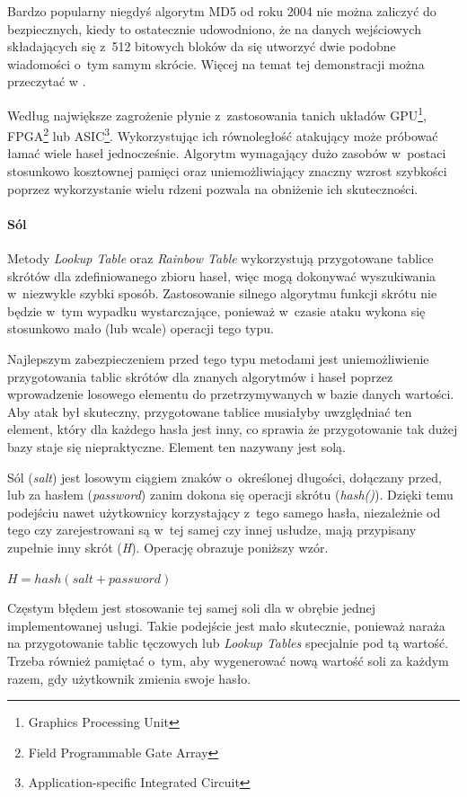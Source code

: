 \documentclass[11pt]{aghdpl}
\begin{document}
Bardzo popularny niegdyś algorytm MD5 od roku 2004 nie można zaliczyć do bezpiecznych, kiedy to ostatecznie udowodniono, że na danych wejściowych składających się z~512 bitowych bloków da się utworzyć dwie podobne wiadomości o~tym samym skrócie. Więcej na temat tej demonstracji można przeczytać w \cite{Md5C06}.

Według \cite{RIG} największe zagrożenie płynie z~zastosowania tanich układów GPU\footnote{Graphics Processing Unit}, FPGA\footnote{Field Programmable Gate Array} lub ASIC\footnote{Application-specific Integrated Circuit}. Wykorzystując ich równoległość atakujący może próbować łamać wiele haseł jednocześnie. Algorytm wymagający dużo zasobów w~postaci stosunkowo kosztownej pamięci oraz uniemożliwiający znaczny wzrost szybkości poprzez wykorzystanie wielu rdzeni pozwala na obniżenie ich skuteczności. 

\paragraph{Sól}
\label{sec:sol}

Metody \emph{Lookup Table} oraz \emph{Rainbow Table} wykorzystują przygotowane tablice skrótów dla zdefiniowanego zbioru haseł, więc mogą dokonywać wyszukiwania w~niezwykle szybki sposób. Zastosowanie silnego algorytmu funkcji skrótu nie będzie w~tym wypadku wystarczające, ponieważ w~czasie ataku wykona się stosunkowo mało (lub wcale) operacji tego typu.

Najlepszym zabezpieczeniem przed tego typu metodami jest uniemożliwienie przygotowania tablic skrótów dla znanych algorytmów i haseł poprzez wprowadzenie losowego elementu do przetrzymywanych w bazie danych wartości. Aby atak był skuteczny, przygotowane tablice musiałyby uwzględniać ten element, który dla każdego hasła jest inny, co sprawia że przygotowanie tak dużej bazy staje się niepraktyczne. Element ten nazywany jest solą.

Sól (\emph{salt}) jest losowym ciągiem znaków o~określonej długości, dołączany przed, lub za hasłem (\emph{password}) zanim dokona się operacji skrótu (\emph{hash()}). Dzięki temu podejściu nawet użytkownicy korzystający z~tego samego hasła, niezależnie od tego czy zarejestrowani są w~tej samej czy innej usłudze, mają przypisany zupełnie inny skrót (\emph{H}). Operację obrazuje poniższy wzór.

$H = hash(salt + password)$

Częstym błędem jest stosowanie tej samej soli dla w obrębie jednej implementowanej usługi. Takie podejście jest mało skutecznie, ponieważ naraża na przygotowanie tablic tęczowych lub \emph{Lookup Tables} specjalnie pod tą wartość. Trzeba również pamiętać o~tym, aby wygenerować nową wartość soli za każdym razem, gdy użytkownik zmienia swoje hasło.
\end{document}
